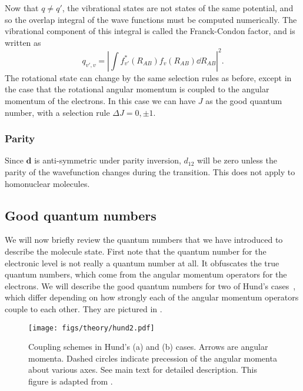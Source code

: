 Now that $q\neq q'$, the vibrational states are not states of the same
potential, and so the overlap integral of the wave functions must
be computed numerically. The vibrational component of this integral is called
the Franck-Condon factor, and is written as
%
\begin{equation}
  q_{v',v} = \left|\int f^*_{v'}(R_{AB})f_v(R_{AB})\dd R_{AB}\right|^2.
\end{equation}
%
The rotational state can change by the same selection rules as before, except
in the case that the rotational angular momentum is coupled to the angular
momentum of the electrons. In this case we can have $J$ as the good quantum
number, with a selection rule $\Delta J = 0, \pm1$.

\subsubsection{Parity}

Since $\mathbf{d}$ is anti-symmetric under parity inversion, $d_{12}$ will be
zero unless the parity of the wavefunction changes during the transition. This
does not apply to homonuclear molecules. 

\subsection{Good quantum numbers}
\label{theory:qnos}

We will now briefly review the quantum numbers that we have introduced to
describe the molecule state. First note that the quantum number for the
electronic level is not really a quantum number at all. It obfuscates the true
quantum numbers, which come from the angular momentum operators for the
electrons. We will describe the good quantum numbers for two of Hund's
cases~\cite{brown_carrington_2003}, which differ depending on how strongly each
of the angular momentum operators couple to each other. They are pictured in
.

\begin{figure}
  \centering
  \texttt{[image: figs/theory/hund2.pdf]}
  \caption{Coupling schemes in Hund's (a) and (b) cases. Arrows are angular
    momenta. Dashed circles indicate precession of the angular momenta about
    various axes. See main text for detailed description. This figure is
    adapted from .
  }
  \label{theory:fig:hund}
\end{figure}


